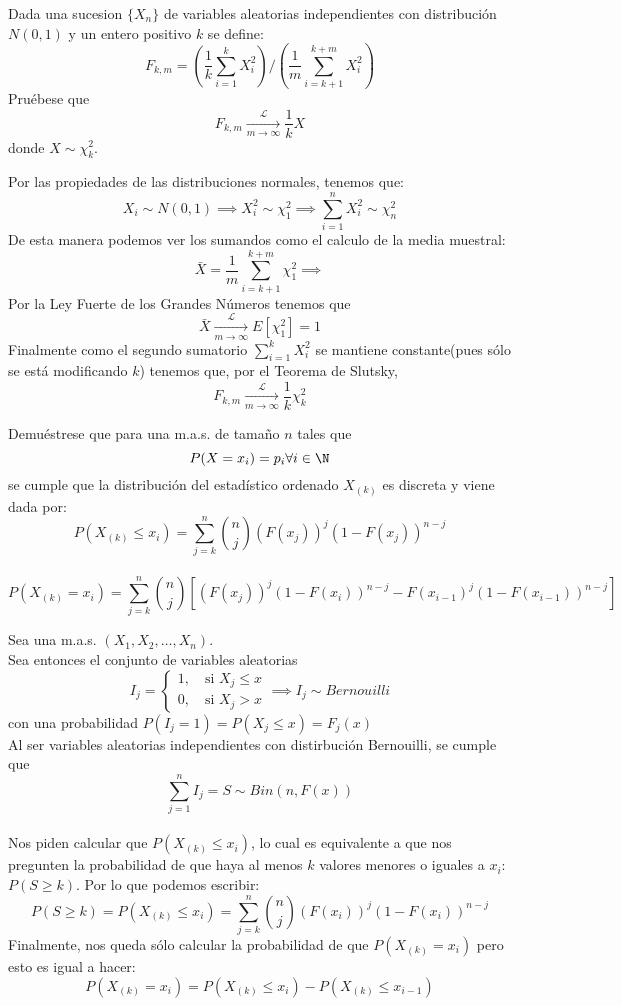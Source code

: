 \begin{problem}{2.4}
Dada una sucesion $\{X_n\}$ de variables aleatorias independientes con distribución $N(0,1)$ y un entero positivo $k$ se define:
$$F_{k,m} = \left(\frac{1}{k}\sum_{i = 1}^k X_i^2 \right) / \left(\frac{1}{m}\sum_{i = k+1}^{k+m}X_i^2\right)$$
Pruébese que
\[
	F_{k,m} \xrightarrow[m \to \infty]{\mathcal{L}} \frac{1}{k} X
\]
donde \( X \sim \chi^2_k \).
\end{problem}
\begin{sol}
	Por las propiedades de las distribuciones normales, tenemos que: $$X_i \sim N(0,1) \implies X_i^2 \sim \chi^2_1 \implies \sum_{i = 1}^{n} X_i^2 \sim \chi_n^2$$
	De esta manera podemos ver los sumandos como el calculo de la media muestral: $$\bar{X} = \frac{1}{m} \sum_{i = k+1}^{k+m} \chi^2_1 \implies $$ Por la Ley Fuerte de los Grandes Números tenemos que $$\bar{X} \xrightarrow[m \to \infty]{\mathcal{L}} E[\chi^2_1] = 1$$
	Finalmente como el segundo sumatorio $\sum_{i = 1}^{k} X_i^2$ se mantiene constante(pues sólo se está modificando $k$) tenemos que, por el Teorema de Slutsky, $$F_{k,m} \xrightarrow[m \to \infty]{\mathcal{L}} \frac{1}{k} \chi_k^2$$
\end{sol}
\begin{problem}{2.5}
Demuéstrese que para una m.a.s. de tamaño $n$ tales que $$P(X = x_i) = p_i \forall i \in \N$$ se cumple que la distribución del estadístico ordenado $X_{(k)}$ es discreta y viene dada por:
$$P(X_{(k)} \leq x_i) = \sum_{j = k}^{n} \binom{n}{j} (F(x_j))^j(1-F(x_j))^{n-j}$$
\\
$$P(X_{(k)} = x_i) = \sum_{j = k}^{n} \binom{n}{j} \left[(F(x_j))^j(1 - F(x_i))^{n-j} - F(x_{i-1})^j(1 - F(x_{i-1}))^{n-j}\right] $$
\end{problem}
\begin{sol}
	Sea una m.a.s. $\left(X_1, X_2, \ldots, X_n\right)$. \\Sea entonces el conjunto de variables aleatorias $$I_j = \begin{cases} 1, \quad \text{si } X_j \leq x \\ 0, \quad \text{si } X_j > x \end{cases} \implies I_j \sim Bernouilli$$ con una probabilidad $P(I_j = 1) = P(X_j \leq x) = F_j(x)$\\ Al ser variables aleatorias independientes con distirbución Bernouilli, se cumple que $$\sum_{j = 1}^{n} I_j = S \sim Bin(n, F(x))$$\\
	Nos piden calcular que $P(X_{(k)} \leq x_i)$, lo cual es equivalente a que nos pregunten la probabilidad de que haya al menos $k$ valores menores o iguales a $x_i$: $P(S \geq k)$. Por lo que podemos escribir:
	$$P(S \geq k) = P(X_{(k)} \leq x_i) = \sum_{j = k}^{n} \binom{n}{j}(F(x_i))^j(1 - F(x_i))^{n-j}$$
	Finalmente, nos queda sólo calcular la probabilidad de que $P(X_{(k)} = x_i)$ pero esto es igual a hacer:
	$$P(X_{(k)} = x_i) = P(X_{(k)} \leq x_i) - P(X_{(k)} \leq x_{i-1})$$
\end{sol}